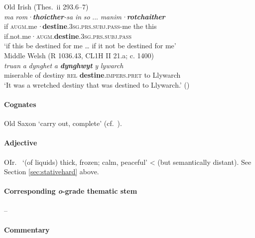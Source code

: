 \documentclass[output=paper,colorlinks,citecolor=brown]{langscibook}
\begin{document}
\begin{exe}
    \ex Old Irish (Thes.\ ii 293.6--7) \label{ex:Caushard1}\\
        \gll \textit{ma} {\textit{rom·}\textbf{\textit{thoicther}}\textit{-sa} } \textit{in} {\textit{so} ...} \textit{manim·}\textbf{\textit{rotchaither}} \\
        if \textsc{augm}.me\textit{·}\textbf{destine}.\textsc{3sg.prs.subj.pass}-me the this if.not.me·\textsc{augm}.\textbf{destine}.\textsc{3sg.prs.subj.pass}\\
        \glt ‘if this be destined for me … if it not be destined for me’\\
    \ex Middle Welsh (R 1036.43, CL1H II 21.a; c. 1400)\label{ex:Caushard2}\\
        \gll \textit{truan} \textit{a} \textit{dynghet} \textit{a} {\textbf{\textit{dynghwyt}} } \textit{y} \textit{lywarch} \\
        miserable of destiny \textsc{rel} \textbf{destine}.\textsc{impers.pret} to Llywarch \\
        \glt ‘It was a wretched destiny that was destined to Llywarch.’ (\citealt[53]{Schumacher1995})\\
\end{exe}

\paragraph*{Cognates}

Old Saxon  ‘carry out, complete’ (cf.\ ).

\paragraph*{Adjective} 

OIr.\   ‘(of liquids) thick, frozen; calm, peaceful’ <  (but semantically distant). See Section \ref{sec:stativehard} above.

\paragraph*{Corresponding \textit{o}-grade thematic stem}  -- 


\paragraph*{Commentary}
\end{document}
